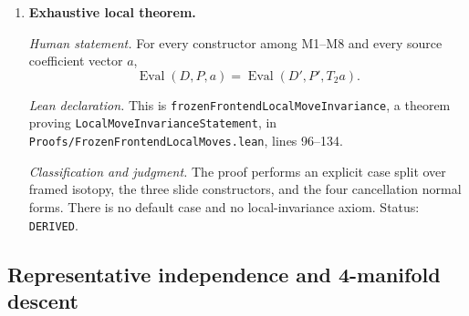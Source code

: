 \begin{enumerate}[label=\textbf{M\arabic*.},leftmargin=*]
\emph{Proof and judgment.}
The proof combines representative independence, the ordinary-loop global
dimension theorem, and field cancellation using
$\operatorname{Dim}(\cC)\ne0$.  The result is
\nolinkurl{twoThreeDeath_preserves_evaluation}.  Status: \texttt{PROVED}.

\item \textbf{Exhaustive local theorem.}

\emph{Human statement.}
For every constructor among M1--M8 and every source coefficient vector $a$,
\[
 \operatorname{Eval}(D,P,a)
 =\operatorname{Eval}(D',P',T_2a).
\]

\emph{Lean declaration.}
This is \nolinkurl{frozenFrontendLocalMoveInvariance}, a theorem proving
\texttt{LocalMoveInvarianceStatement}, in
\nolinkurl{Proofs/FrozenFrontendLocalMoves.lean}, lines 96--134.

\emph{Classification and judgment.}
The proof performs an explicit case split over framed isotopy, the three slide
constructors, and the four cancellation normal forms.  There is no default
case and no local-invariance axiom.  Status: \texttt{DERIVED}.

\end{enumerate}

\subsection{Representative independence and 4-manifold descent}
\label{app:lean-descent}

